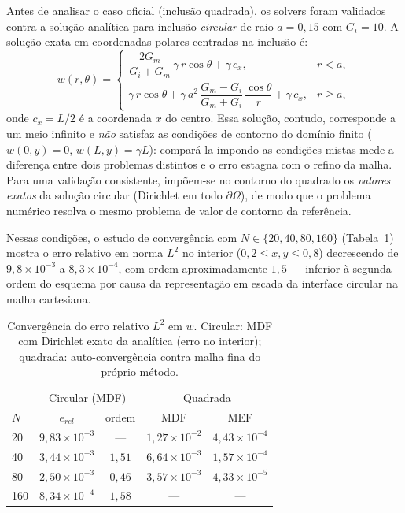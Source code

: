 \documentclass[brazil]{TCAM} %
\begin{document}
Antes de analisar o caso oficial (inclusão quadrada), os solvers foram validados
contra a solução analítica para inclusão \emph{circular} de raio $a = 0{,}15$
com $G_i = 10$. A solução exata em coordenadas polares centradas na inclusão é:
\begin{equation*}
    w(r,\theta) =
    \begin{cases}
        \dfrac{2G_m}{G_i+G_m}\,\gamma\,r\cos\theta + \gamma\,c_x,
        & r < a, \\[4pt]
        \gamma\,r\cos\theta
        + \gamma\,a^2\,\dfrac{G_m-G_i}{G_m+G_i}\,\dfrac{\cos\theta}{r}
        + \gamma\,c_x,
        & r \ge a,
    \end{cases}
\end{equation*}
onde $c_x = L/2$ é a coordenada $x$ do centro. Essa solução, contudo, corresponde a
um meio infinito e \emph{não} satisfaz as condições de contorno do domínio finito
($w(0,y)=0$, $w(L,y)=\gamma L$): compará-la impondo as condições mistas mede a
diferença entre dois problemas distintos e o erro estagna com o refino da malha.
Para uma validação consistente, impõem-se no contorno do quadrado os \emph{valores
exatos} da solução circular (Dirichlet em todo $\partial\Omega$), de modo que o
problema numérico resolva o mesmo problema de valor de contorno da referência.

Nessas condições, o estudo de convergência com $N \in \{20, 40, 80, 160\}$
(Tabela~\ref{tab:conv}) mostra o erro relativo em norma $L^2$ no interior
($0{,}2 \le x,y \le 0{,}8$) decrescendo de $9{,}8\times10^{-3}$ a
$8{,}3\times10^{-4}$, com ordem aproximadamente $1{,}5$ --- inferior à segunda ordem
do esquema por causa da representação em escada da interface circular na malha
cartesiana.

\begin{table}[h]
\centering
\caption{Convergência do erro relativo $L^2$ em $w$. Circular: MDF com Dirichlet
exato da analítica (erro no interior); quadrada: auto-convergência contra malha
fina do próprio método.}
\label{tab:conv}
\begin{tabular}{lcccc}
\hline
 & \multicolumn{2}{c}{Circular (MDF)} & \multicolumn{2}{c}{Quadrada} \\
$N$ & $e_{rel}$ & ordem & MDF & MEF \\
\hline
20  & $9{,}83\times10^{-3}$ & ---      & $1{,}27\times10^{-2}$ & $4{,}43\times10^{-4}$ \\
40  & $3{,}44\times10^{-3}$ & $1{,}51$ & $6{,}64\times10^{-3}$ & $1{,}57\times10^{-4}$ \\
80  & $2{,}50\times10^{-3}$ & $0{,}46$ & $3{,}57\times10^{-3}$ & $4{,}33\times10^{-5}$ \\
160 & $8{,}34\times10^{-4}$ & $1{,}58$ & ---                   & ---                   \\
\hline
\end{tabular}
\end{table}
\end{document}
